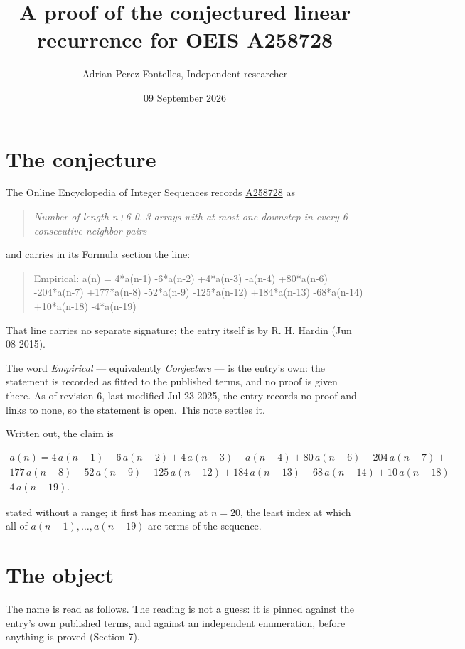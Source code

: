 \documentclass[11pt]{article}
\title{A proof of the conjectured linear recurrence for OEIS A258728}
\author{Adrian Perez Fontelles, Independent researcher}
\date{09 September 2026}
\theoremstyle{definition}
\begin{document}
\maketitle
\section{The conjecture}

The Online Encyclopedia of Integer Sequences records \href{https://oeis.org/A258728}{A258728} as

\begin{quote}\itshape Number of length n+6 0..3 arrays with at most one downstep in every 6 consecutive neighbor pairs\end{quote}

and carries in its Formula section the line:

\begin{quote}\ttfamily Empirical: a(n) = 4*a(n-1) -6*a(n-2) +4*a(n-3) -a(n-4) +80*a(n-6) -204*a(n-7) +177*a(n-8) -52*a(n-9) -125*a(n-12) +184*a(n-13) -68*a(n-14) +10*a(n-18) -4*a(n-19)\end{quote}

That line carries no separate signature; the entry itself is by R. H. Hardin (Jun 08 2015).

The word {\itshape Empirical} --- equivalently {\itshape Conjecture} --- is the entry's own: the statement is recorded as fitted to the published terms, and no proof is given there. As of revision 6, last modified Jul 23 2025, the entry records no proof and links to none, so the statement is open. This note settles it.

Written out, the claim is

\begin{multline*} a(n) = 4\,a(n-1) - 6\,a(n-2) + 4\,a(n-3) - a(n-4) + 80\,a(n-6) - 204\,a(n-7) + \\ 177\,a(n-8) - 52\,a(n-9) - 125\,a(n-12) + 184\,a(n-13) - 68\,a(n-14) + 10\,a(n-18) - \\ 4\,a(n-19). \end{multline*}

stated without a range; it first has meaning at $n = 20$, the least index at which all of $a(n-1),\dots,a(n-19)$ are terms of the sequence.

\section{The object}

The name is read as follows. The reading is not a guess: it is pinned against the entry's own published terms, and against an independent enumeration, before anything is proved (Section 7).
\end{document}
